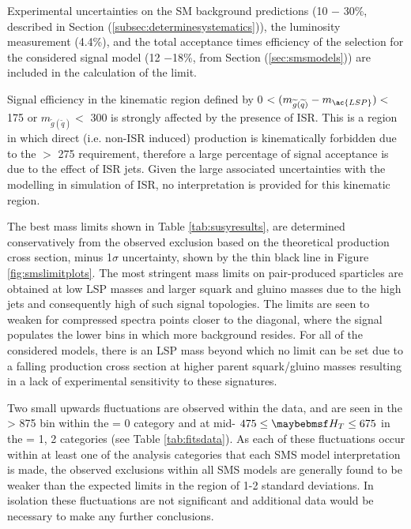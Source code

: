 Experimental uncertainties on the \ac{SM} background predictions (10 $-$ 30\%, described in Section (\ref{subsec:determinesystematics})), the luminosity measurement (4.4\%), and the total acceptance times efficiency of the selection for the considered signal model (12 $-$18\%, from Section (\ref{sec:smsmodels})) are included in the calculation of the limit. 

Signal efficiency in the kinematic region defined by 0 $< (m_{\widetilde{g}(\widetilde{q})} - m_{\ac{LSP}})<$ 175 \GeV or $m_{\widetilde{g}(\widetilde{q})} <$ 300 \GeV is strongly affected by the presence of \acf{ISR}. This is a region in which direct (i.e. non-\ac{ISR} induced) production is kinematically forbidden due to the \theht $>$ 275 \GeV requirement, therefore a large percentage of signal acceptance is due to the effect of \ac{ISR} jets. Given the large associated uncertainties with the modelling in simulation of \ac{ISR}, no interpretation is provided for this kinematic region.

The best mass limits shown in Table  \ref{tab:susyresults}, are determined conservatively from the observed exclusion based on the theoretical production cross section, minus 1$\sigma$ uncertainty, shown by the thin black line in Figure \ref{fig:smslimitplots}. The most stringent mass limits on pair-produced sparticles are obtained at low \ac{LSP} masses and larger squark and gluino masses due to the high \pt jets and consequently high \theht of such signal topologies. The limits are seen to weaken for compressed spectra points closer to the diagonal, where the signal populates the lower \theht bins in which more background resides. For all of the considered models, there is an \ac{LSP} mass beyond which no limit can be set due to a falling production cross section at higher parent squark/gluino masses resulting in a lack of experimental sensitivity to these signatures. 

Two small upwards fluctuations are observed within the data, and are seen in the \theht > 875 \GeV bin within the \nbreco = 0 category and at mid- $475 \leq \theht \leq 675$ in the \nbreco = 1, 2 categories (see Table \ref{tab:fitsdata}). As each of these fluctuations occur within at least one of the analysis categories that each \ac{SMS} model interpretation is made, the observed exclusions within all \ac{SMS} models are generally found to be weaker than the expected limits in the region of 1-2 standard deviations. In isolation these fluctuations are not significant and additional data would be necessary to make any further conclusions.

